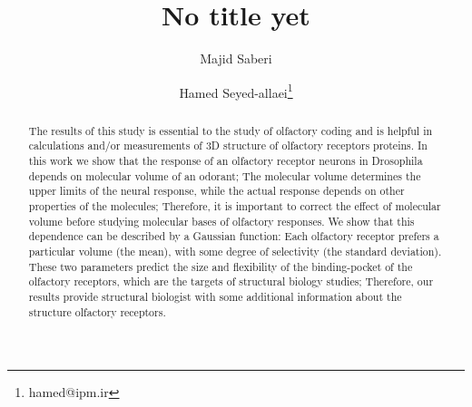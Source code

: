 \documentclass[11pt]{paper} %
\title{No title yet}
\author{Majid Saberi \and Hamed Seyed-allaei\thanks{hamed@ipm.ir}}
\begin{document}
\maketitle

\begin{abstract}
	The results of this study is essential to the study of olfactory coding and is helpful in calculations and/or measurements of 3D  structure of olfactory receptors proteins.
	In this work we show that the response of an olfactory receptor neurons in Drosophila depends on molecular volume of an odorant;  
	The molecular volume determines the upper limits of the neural response, 
	while the actual response depends on other properties of the molecules; 
	Therefore, it is important to correct the effect of molecular volume before studying molecular bases of olfactory responses.
	We show that this dependence can be described by a Gaussian function: 
	Each olfactory receptor prefers a particular volume (the mean), 
	with some degree of selectivity (the standard deviation). 
	These two parameters predict the size and flexibility of the binding-pocket of the olfactory receptors, 
	which are the targets of structural biology studies; 
	Therefore, our results provide structural biologist with some additional information about the structure olfactory receptors. 
\end{abstract}
\end{document}
